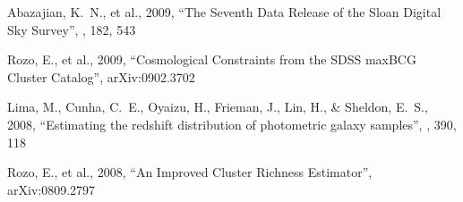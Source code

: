 \documentclass[12pt]{report}
\begin{document}
\begin{thebibliography}{12}
 Abazajian, K.~N., et 
al.,   2009,  ``The Seventh Data Release of the Sloan Digital Sky Survey'', 
\apjs, 182, 543 


 Rozo, E., et al.,   2009,  
``Cosmological Constraints from the SDSS maxBCG Cluster Catalog'', 
arXiv:0902.3702 


 Lima, M., Cunha, C.~E., 
Oyaizu, H., Frieman, J., Lin, H., 
\& Sheldon, E.~S.,   2008,  ``Estimating the redshift distribution of photometric galaxy samples'', \mnras, 390, 118 


 Rozo, E., et al.,   2008,  
``An Improved Cluster Richness Estimator'', arXiv:0809.2797 





\end{thebibliography}
\end{document}
